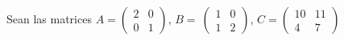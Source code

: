\documentclass[addpoints,spanish, 12pt,a4paper]{exam}
\begin{document}
\begin{questions}

%
%
%






\question 
Sean las matrices $A=\left(\begin{matrix}2 & 0\\0 & 1\end{matrix}\right)$, $B= \  \left(\begin{matrix}1 & 0\\1 & 2\end{matrix}\right)$, $C=\left(\begin{matrix}10 & 11\\4 & 7\end{matrix}\right)$
\begin{parts}

\end{parts}
\end{questions}
\end{document}
